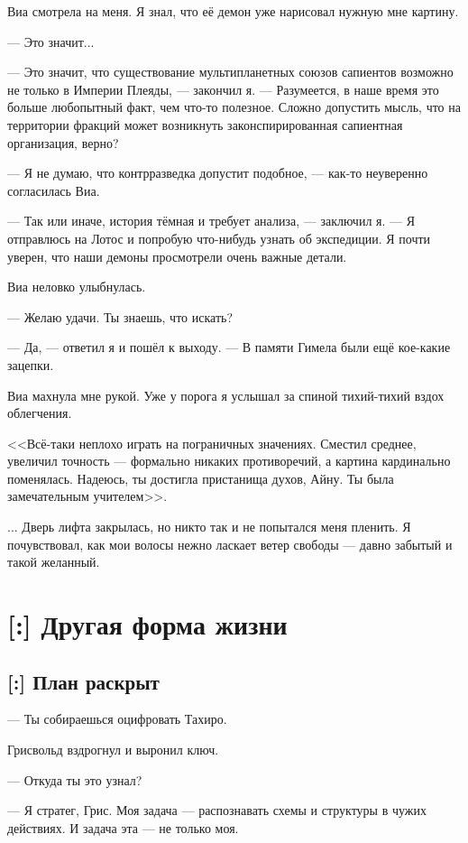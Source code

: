 Виа смотрела на меня.
Я знал, что её демон уже нарисовал нужную мне картину.

--- Это значит...

--- Это значит, что существование мультипланетных союзов сапиентов возможно не только в Империи Плеяды, --- закончил я.
--- Разумеется, в наше время это больше любопытный факт, чем что-то полезное.
Сложно допустить мысль, что на территории фракций может возникнуть законспирированная сапиентная организация, верно?

--- Я не думаю, что контрразведка допустит подобное, --- как-то неуверенно согласилась Виа.

--- Так или иначе, история тёмная и требует анализа, --- заключил я.
--- Я отправлюсь на Лотос и попробую что-нибудь узнать об экспедиции.
Я почти уверен, что наши демоны просмотрели очень важные детали.

Виа неловко улыбнулась.

--- Желаю удачи.
Ты знаешь, что искать?

--- Да, --- ответил я и пошёл к выходу.
--- В памяти Гимела были ещё кое-какие зацепки.

Виа махнула мне рукой.
Уже у порога я услышал за спиной тихий-тихий вздох облегчения.

<<Всё-таки неплохо играть на пограничных значениях.
Сместил среднее, увеличил точность --- формально никаких противоречий, а картина кардинально поменялась.
Надеюсь, ты достигла пристанища духов, Айну.
Ты была замечательным учителем>>.

... Дверь лифта закрылась, но никто так и не попытался меня пленить.
Я почувствовал, как мои волосы нежно ласкает ветер свободы --- давно забытый и такой желанный.

\chapter{[:] Другая форма жизни}

\section{[:] План раскрыт}

--- Ты собираешься оцифровать Тахиро.

Грисвольд вздрогнул и выронил ключ.

--- Откуда ты это узнал?

--- Я стратег, Грис.
Моя задача --- распознавать схемы и структуры в чужих действиях.
И задача эта --- не только моя.

